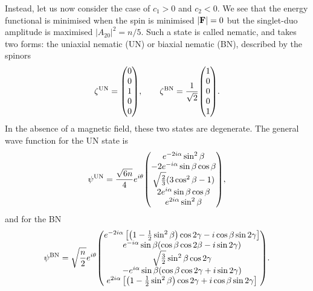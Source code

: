 Instead, let us now consider the case of \(c_1 > 0\) and \(c_2 < 0\).
We see that the energy functional is minimised when the spin is minimised
\(|\vb{F}| = 0\) but the singlet-duo amplitude is maximised
\(|A_{20}|^2 = n/5\).
Such a state is called nematic, and takes two forms: the uniaxial nematic (UN)
or biaxial nematic (BN), described by the spinors
\begin{equation}
    \zeta^\mathrm{UN} = \mqty(0 \\ 0 \\ 1 \\ 0 \\ 0), \qquad
    \zeta^\mathrm{BN} = \frac{1}{\sqrt{2}}\mqty(1 \\ 0 \\0 \\ 0 \\ 1).
\end{equation}
In the absence of a magnetic field, these two states are degenerate.
The general wave function for the UN state is
\begin{equation}\label{eq: UN-representative-spinor}
    \psi^\mathrm{UN} = \frac{\sqrt{6n}}{4}e^{i\theta}\mqty(
    e^{-2i\alpha} \sin^2\beta \\
    -2e^{-i\alpha} \sin\beta \cos\beta \\
    \sqrt{\frac{2}{3}}(3\cos^2\beta - 1) \\
    2e^{i\alpha} \sin\beta \cos\beta \\
    e^{2i\alpha} \sin^2\beta
    ),
\end{equation}
and for the BN
\begin{equation}\label{eq: BN-representative-spinor}
    \psi^\mathrm{BN} = \sqrt{\frac{n}{2}}e^{i\theta} \mqty(
    e^{-2i\alpha}\left[\left(1 - \frac{1}{2}\sin^2\beta\right)\cos 2\gamma
        - i\cos\beta\sin 2\gamma\right] \\
    e^{-i\alpha}\sin\beta(\cos\beta\cos 2\beta - i\sin 2\gamma) \\
    \sqrt{\frac{3}{2}}\sin^2\beta \cos 2\gamma \\
    -e^{i\alpha}\sin\beta(\cos\beta\cos 2\gamma + i\sin 2\gamma) \\
    e^{2i\alpha}\left[\left(1 - \frac{1}{2}\sin^2\beta\right)\cos 2\gamma
        + i\cos\beta\sin 2\gamma\right]
    ).
\end{equation}

